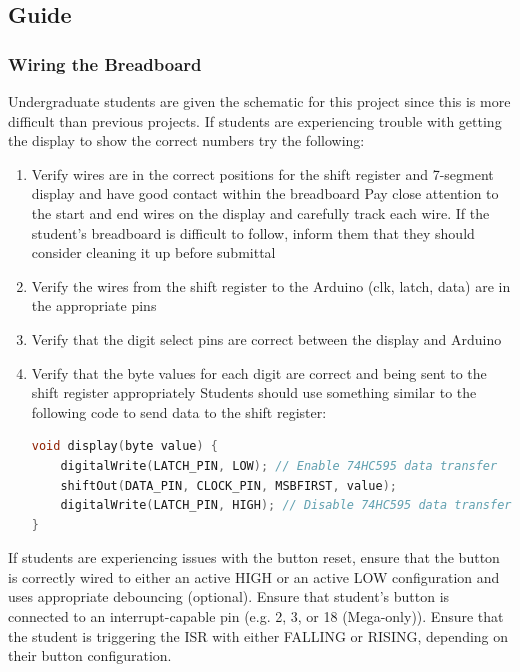 \documentclass{article}
\begin{document}
    \subsection*{Guide}
        \subsubsection*{Wiring the Breadboard}
        Undergraduate students are given the schematic for this project since this is more difficult than previous projects.
        If students are experiencing trouble with getting the display to show the correct numbers try the following:

        \begin{enumerate}
            \item Verify wires are in the correct positions for the shift register and 7-segment display and have good contact within the breadboard
                \subitem Pay close attention to the start and end wires on the display and carefully track each wire.
                \subitem If the student's breadboard is difficult to follow, inform them that they should consider cleaning it up before submittal
            \item Verify the wires from the shift register to the Arduino (clk, latch, data) are in the appropriate pins
            \item Verify that the digit select pins are correct between the display and Arduino
            \item Verify that the byte values for each digit are correct and being sent to the shift register appropriately
                \subitem Students should use something similar to the following code to send data to the shift register:
                \begin{lstlisting}[style=mystyle, language=C++]
void display(byte value) {
    digitalWrite(LATCH_PIN, LOW); // Enable 74HC595 data transfer
    shiftOut(DATA_PIN, CLOCK_PIN, MSBFIRST, value);
    digitalWrite(LATCH_PIN, HIGH); // Disable 74HC595 data transfer
}
                \end{lstlisting}  
        \end{enumerate}

        If students are experiencing issues with the button reset, ensure that the button is correctly wired to either an active HIGH or an active LOW configuration and uses appropriate debouncing (optional).
        Ensure that student's button is connected to an interrupt-capable pin (e.g. 2, 3, or 18 (Mega-only)).
        Ensure that the student is triggering the ISR with either FALLING or RISING, depending on their button configuration.
\end{document}
